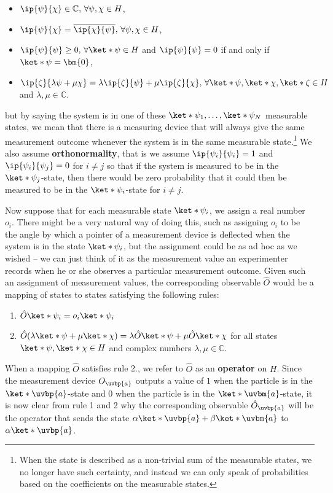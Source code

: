 \documentclass[12pt]{report}
\begin{document}
{\begin{itemize}[topsep=0pt]
\item $\ip{\psi}{\chi}\in\mathbb{C},\,\forall\psi,\chi\in H$,
\item $\ip{\psi}{\chi}=\overline{\ip{\chi}{\psi}},\,\forall\psi,\chi\in H$,
\item $\ip{\psi}{\psi}\geq 0,\, \forall \ket*{\psi}\in H$ and $\ip{\psi}{\psi}=0$ if and only if $\ket*{\psi}=\bm{0}$,
\item $\ip{\zeta}{\lambda\psi+\mu\chi}=\lambda\ip{\zeta}{\psi}+\mu\ip{\zeta}{\chi},\,\forall \ket*{\psi},\ket*{\chi},\ket*{\zeta}\in H$ and  $\lambda,\mu\in\mathbb{C}$.
\end{itemize}} but by saying the system is in one of these $\ket*{\psi_1},\ldots,\ket*{\psi_N}$ measurable states, we mean that there is a measuring device that will always give the same measurement outcome whenever the system is in the same measurable state.\footnote{When the state is described as a non-trivial sum of the measurable states, we no longer have such certainty, and instead we can only speak of probabilities based on the coefficients on the measurable states.} We also assume \textbf{orthonormality}, that is we assume $\ip{\psi_i}{\psi_i}=1$ and $\ip{\psi_i}{\psi_j}=0$ for $i\neq j$ so that if the system is measured to be in the $\ket*{\psi_j}$-state, then there would be zero probability that it could then be measured to be in the $\ket*{\psi_i}$-state for $i\neq j$.  

Now suppose that for each measurable state $\ket*{\psi_i}$, we assign a real number $o_i$. %
%
There might be a very natural way of doing this, such as assigning  $o_i$ to be the angle by which a pointer of a measurement device is deflected when the system is in the state $\ket*{\psi_i}$,  %
%
but the assignment could be as ad hoc as we wished – we can just think of it as the measurement value an experimenter records when he or she observes a particular measurement outcome. Given such an assignment of measurement values, the corresponding observable $\hat{O}$ would be a mapping of states to states satisfying the following rules:
\begin{enumerate}[noitemsep, nosep, topsep=0pt]
\item $\hat{O}\ket*{\psi_i}=o_i\ket*{\psi_i}$
\item $\hat{O}(\lambda\ket*{\psi}+\mu\ket*{\chi})=\lambda\hat{O}\ket*{\psi}+\mu\hat{O}\ket*{\chi}$  for all states $\ket*{\psi},\ket*{\chi}\in H$ and complex numbers $\lambda,\mu\in\mathbb{C}$.
\end{enumerate}
When a mapping $\hat{O}$ satisfies rule 2., we refer to $\hat{O}$ as an \textbf{operator} on $H$. Since the measurement device $O_{\uvbp{a}}$ outputs a value of $1$ when the particle is in the $\ket*{\uvbp{a}}$-state and $0$ when the particle is in the $\ket*{\uvbm{a}}$-state, it is now clear from rule 1 and 2 why the corresponding observable $\hat{O}_{\uvbp{a}}$ will be the operator that sends the state $\alpha\ket*{\uvbp{a}}+\beta\ket*{\uvbm{a}}$ to $\alpha\ket*{\uvbp{a}}$.
\end{document}
